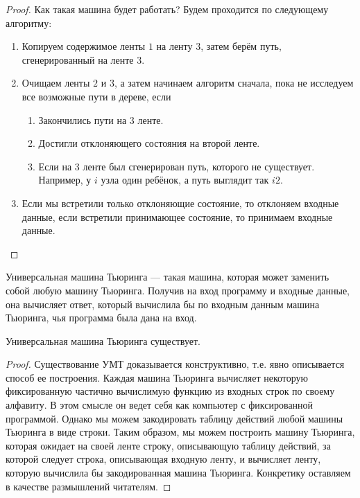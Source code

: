 \begin{proof}
        \par Как такая машина будет работать? Будем проходится по следующему алгоритму:
        \begin{enumerate}
            \item Копируем содержимое ленты $1$ на ленту $3$, затем берём путь, сгенерированный на ленте $3$.
            \item Очищаем ленты $2$ и $3$, а затем начинаем алгоритм сначала, пока не исследуем все возможные пути в дереве, если
                \begin{enumerate}
                    \item Закончились пути на $3$ ленте.
                    \item Достигли отклоняющего состояния на второй ленте.
                    \item Если на 3 ленте был сгенерирован путь, которого не существует. Например, у $i$ узла один ребёнок, а путь выглядит так $i2$.
                \end{enumerate}
            \item Если мы встретили только отклоняющие состояние, то отклоняем входные данные, если встретили принимающее состояние, то принимаем входные данные.
        \end{enumerate}
    \end{proof}

        
    
    \begin{Def} 
    Универсальная машина Тьюринга --- такая машина, которая может заменить собой любую машину Тьюринга. Получив на вход программу и входные данные, она вычисляет ответ, который вычислила бы по входным данным машина Тьюринга, чья программа была дана на вход.
    \end{Def}
    \begin{Thm}
        Универсальная машина Тьюринга существует.
    \end{Thm}
    \begin{proof}
        Существование УМТ доказывается конструктивно, т.е. явно описывается способ ее построения. Каждая машина Тьюринга вычисляет некоторую фиксированную частично вычислимую функцию из входных строк по своему алфавиту. В этом смысле он ведет себя как компьютер с фиксированной программой. Однако мы можем закодировать таблицу действий любой машины Тьюринга в виде строки. Таким образом, мы можем построить машину Тьюринга, которая ожидает на своей ленте строку, описывающую таблицу действий, за которой следует строка, описывающая входную ленту, и вычисляет ленту, которую вычислила бы закодированная машина Тьюринга. Конкретику оставляем в качестве размышлений читателям.
    \end{proof}
    
